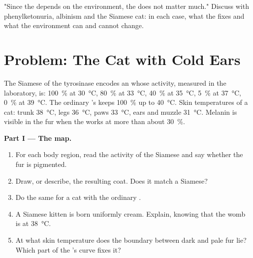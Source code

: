 \begin{exercise}[$\star\star\star$]\label{exo:g11:enzymes-and-phenotype:15}
"Since the  depends on the environment, the  does
not matter much." Discuss with phenylketonuria, albinism and the
Siamese cat: in each case, what the  fixes and what the
environment can and cannot change.
\end{exercise}

\section{Problem: The Cat with Cold Ears}

\begin{problem}
\label{pb:g11:enzymes-and-phenotype:1}
The Siamese  of the tyrosinase  encodes an  whose
activity, measured in the laboratory, is: \qty{100}{\percent} at
\qty{30}{\celsius}, \qty{80}{\percent} at \qty{33}{\celsius},
\qty{40}{\percent} at \qty{35}{\celsius}, \qty{5}{\percent} at
\qty{37}{\celsius}, \qty{0}{\percent} at \qty{39}{\celsius}. The
ordinary 's  keeps \qty{100}{\percent} up to
\qty{40}{\celsius}. Skin temperatures of a cat: trunk
\qty{38}{\celsius}, legs \qty{36}{\celsius}, paws
\qty{33}{\celsius}, ears and muzzle \qty{31}{\celsius}. Melanin is
visible in the fur when the  works at more than about
\qty{30}{\percent}.

\medskip
\noindent\textbf{Part I --- The map.}
\begin{enumerate}
  \item For each body region, read the activity of the Siamese 
        and say whether the fur is pigmented.
  \item Draw, or describe, the resulting coat. Does it match a Siamese?
  \item Do the same for a cat with the ordinary .
  \item A Siamese kitten is born uniformly cream. Explain, knowing
        that the womb is at \qty{38}{\celsius}.
  \item At what skin temperature does the boundary between dark and
        pale fur lie? Which part of the 's curve fixes it?
\end{enumerate}


\end{problem}
